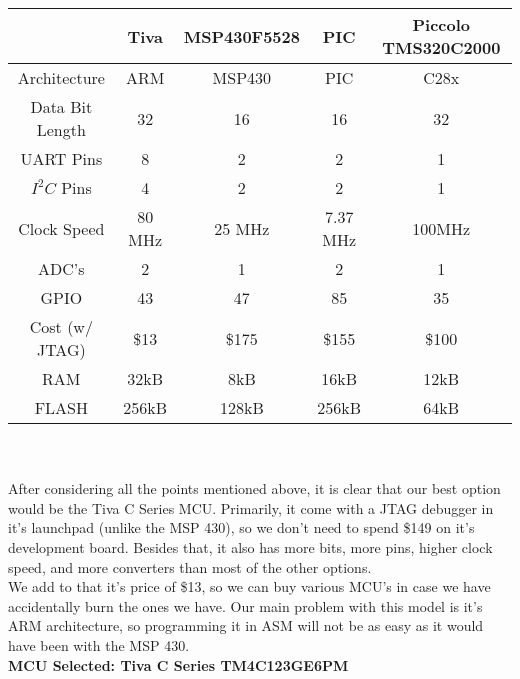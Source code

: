 	
\begin{tabular}{|c|c|c|c|c|}
\hline
& Tiva & MSP430F5528 & PIC & Piccolo TMS320C2000 \\
\hline
Architecture & ARM & MSP430 & PIC & C28x \\ 
Data Bit Length & 32 & 16 & 16 & 32\\ 
UART Pins & 8 & 2 & 2 & 1 \\ 
$I^2C$ Pins & 4 & 2 & 2 & 1 \\ 
Clock Speed & 80 MHz & 25 MHz & 7.37 MHz & 100MHz \\ 
ADC's & 2 & 1 & 2 & 1\\ 
GPIO & 43 & 47 & 85 & 35 \\ 
Cost (w/ JTAG) & \$13 & \$175 & \$155 & \$100 \\ 
RAM & 32kB & 8kB & 16kB & 12kB \\ 
FLASH & 256kB & 128kB & 256kB & 64kB \\ 


\hline
\end{tabular} \\ \\

After considering all the points mentioned above, it is clear that our best option would be the Tiva C Series MCU. Primarily, it come with a JTAG debugger in it's launchpad (unlike the MSP 430), so we don't need to spend \$149 on it's development board. Besides that, it also has more bits, more pins, higher clock speed, and more converters than most of the other options. \\

We add to that it's price of \$13, so we can buy various MCU's in case we have accidentally burn the ones we have. Our main problem with this model is it's ARM architecture, so programming it in ASM will not be as easy as it would have been with the MSP 430. \\

\textbf{MCU Selected: Tiva C Series TM4C123GE6PM}



\newpage




